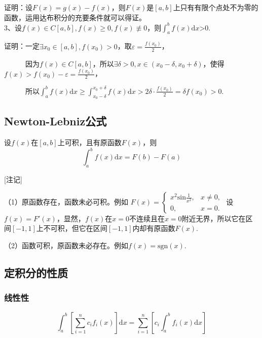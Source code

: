 \documentclass{SCIS2020cn}
\begin{document}
证明：设$F(x)=g(x)-f(x)$，则$F(x)$是$[a,b]$上只有有限个点处不为零的函数，运用达布积分的充要条件就可以得证。\\

3、设$f(x)\in{}C[a,b],f(x)\geqslant0,f(x)\not\equiv0$，则$\displaystyle\int_a^b{f(x)\text{d}x}$>0.

证明：一定$\exists{}x_0\in{}[a,b],f(x_0)>0$，取$\displaystyle\varepsilon=\frac{f(x_0)}{2}$，

　　　因为$f(x)\in{}C[a,b]$，所以$\exists\delta>0,x\in(x_0-\delta,x_0+\delta)$，使得$f(x)>f(x_0)-\displaystyle\varepsilon=\frac{f(x_0)}{2}$，

　　　所以$\displaystyle\int_a^b{f(x)\text{d}x}\geqslant\int_{x_0-\delta}^{x_0+\delta}{f(x)\text{d}x}>2\delta·\frac{f(x_0)}{2}=\delta{}f(x_0)>0$.

\subsection{Newton-Lebniz公式}

设$f(x)$在$[a,b]$上可积，且有原函数$F(x)$，则
\begin{equation}
\displaystyle\int_a^b{f(x)\text{d}x}=F(b)-F(a)
\end{equation}

[注记]

（1）原函数存在，函数未必可积。例如
$F(x)=\left\{\begin{array}{ll}

x^2\text{sin}\frac{1}{x^2},&\text{$x\neq0$},\\

0,&\text{$x=0$}.

\end{array}\right.$
设$f(x)=F'(x)$，显然，$f(x)$在$x=0$不连续且在$x=0$附近无界，所以它在区间$[-1,1]$上不可积，但它在区间$[-1,1]$内却有原函数$F(x)$.

（2）函数可积，原函数未必存在。例如$f(x)=\text{sgn}{(x)}$.

\subsection{定积分的性质}
\subsubsection{线性性}
\begin{equation}
\int_a^b{\left[\sum_{i=1}^nc_if_i(x)\right]\text{d}x}=\sum_{i=1}^n\left[c_i\int_a^b{f_i(x)\text{d}x}\right]
\end{equation}
\end{document}
